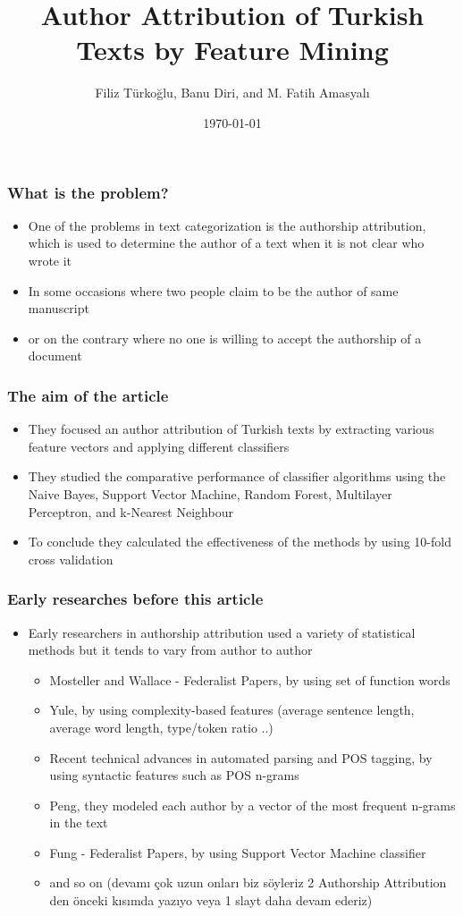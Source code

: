 \documentclass{beamer}
\title{Author Attribution of Turkish Texts by Feature Mining}
\author{Filiz Türkoğlu, Banu Diri, and M. Fatih Amasyalı}
\institute{Narrators: Mehmetcan Güleşçi, Furkan Karakoyunlu}
\date{\today}
\begin{document}
 \frame{\titlepage}
 
 \begin{frame}
  \frametitle{What is the problem?}
  \begin{itemize}
   \item One of the problems in text categorization is the authorship attribution, which is used to determine 
   the author of a text when it is not clear who wrote it
   \item In some occasions where two people claim to be the author of same manuscript 
   \item or on the contrary where no one is willing to accept the authorship of a document
  \end{itemize}
 \end{frame}
 
 \begin{frame}
  \frametitle{The aim of the article}
  \begin{itemize}
   \item They focused an author attribution of Turkish texts by extracting various feature vectors and applying 
   different classifiers
   \item They studied the comparative performance of classifier algorithms using the Naive Bayes, Support Vector 
   Machine, Random Forest, Multilayer Perceptron, and k-Nearest Neighbour
   \item To conclude they calculated the effectiveness of the methods by using 10-fold cross validation
  \end{itemize}
 \end{frame}

 \begin{frame}
  \frametitle{Early researches before this article}
  \begin{itemize}
   \item Early researchers in authorship attribution used a variety of statistical methods but it tends to vary 
   from author to author
   \begin{itemize}
    \item Mosteller and Wallace - Federalist Papers, by using set of function words
    \item Yule, by using complexity-based features (average sentence length, average word length, type/token 
    ratio ..)
    \item Recent technical advances in automated parsing and POS tagging, by using syntactic features such as 
    POS n-grams
    \item Peng, they modeled each author by a vector of the most frequent n-grams in the text
    \item Fung - Federalist Papers, by using Support Vector Machine classifier
    \item and so on (devamı çok uzun onları biz söyleriz 2 Authorship Attribution den önceki kısımda yazıyo 
    veya 1 slayt daha devam ederiz)
   \end{itemize}
  \end{itemize}
 \end{frame}
 
\end{document}
